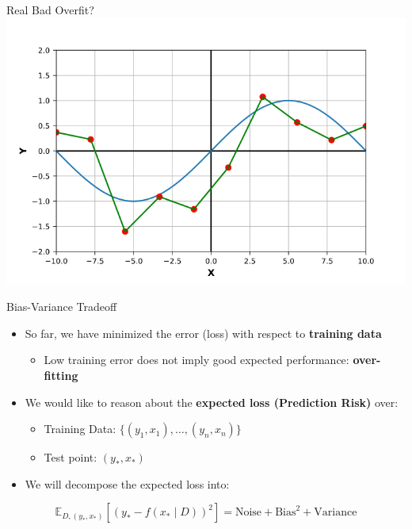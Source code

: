 \begin{frame}{Real Bad Overfit?}
    \centering
    \includegraphics[width=0.9\linewidth]{images/linear-regression/linear-regression-18.png}
\end{frame}


\begin{frame}{Bias-Variance Tradeoff}
\begin{itemize}
    \item So far, we have minimized the error (loss) with respect to \textbf{training data}
    \begin{itemize}
        \item Low training error does not imply good expected performance: \textbf{over-fitting}
    \end{itemize}
    \item We would like to reason about the \textbf{expected loss (Prediction Risk)} over:
    \begin{itemize}
        \item Training Data: $\{(y_1, x_1), \ldots, (y_n, x_n)\}$
        \item Test point: $(y_*, x_*)$
    \end{itemize}
    \item We will decompose the expected loss into:
\end{itemize}

\[
\mathbb{E}_{D,(y_*, x_*)} \left[ \left( y_* - f(x_* \mid D) \right)^2 \right]
= \text{Noise} + \text{Bias}^2 + \text{Variance}
\]
\end{frame}


